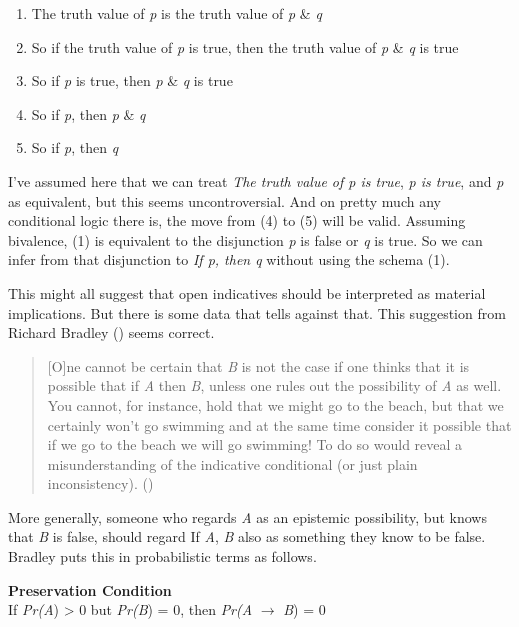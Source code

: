 \documentclass[
  11pt,
  letterpaper,
  DIV=11,
  numbers=noendperiod,
  oneside]{scrartcl}
\providecommand{\tightlist}{%
  \setlength{\itemsep}{0pt}\setlength{\parskip}{0pt}}\usepackage{longtable,booktabs,array}
\begin{document}
\begin{enumerate}
\def\labelenumi{\arabic{enumi}.}
\tightlist
\item
  The truth value of \emph{p} is the truth value of \emph{p} \& \emph{q}
\item
  So if the truth value of \emph{p} is true, then the truth value of
  \emph{p} \& \emph{q} is true
\item
  So if \emph{p} is true, then \emph{p} \& \emph{q} is true
\item
  So if \emph{p}, then \emph{p} \& \emph{q}
\item
  So if \emph{p}, then \emph{q}
\end{enumerate}

I've assumed here that we can treat \emph{The truth value of p is true},
\emph{p is true}, and \emph{p} as equivalent, but this seems
uncontroversial. And on pretty much any conditional logic there is, the
move from (4) to (5) will be valid. Assuming bivalence, (1) is
equivalent to the disjunction \emph{p} is false or \emph{q} is true. So
we can infer from that disjunction to \emph{If p, then q} without using
the schema (1).

This might all suggest that open indicatives should be interpreted as
material implications. But there is some data that tells against that.
This suggestion from Richard Bradley ()
seems correct.

\begin{quote}
{[}O{]}ne cannot be certain that \emph{B} is not the case if one thinks
that it is possible that if \emph{A} then \emph{B}, unless one rules out
the possibility of \emph{A} as well. You cannot, for instance, hold that
we might go to the beach, but that we certainly won't go swimming and at
the same time consider it possible that if we go to the beach we will go
swimming! To do so would reveal a misunderstanding of the indicative
conditional (or just plain inconsistency).
()
\end{quote}

More generally, someone who regards \emph{A} as an epistemic
possibility, but knows that \emph{B} is false, should regard If
\emph{A}, \emph{B} also as something they know to be false. Bradley puts
this in probabilistic terms as follows.

\textbf{Preservation Condition}\\
If \emph{Pr(A}) \textgreater{} 0 but \emph{Pr(B}) = 0, then \emph{Pr(A}
\(\rightarrow\) \emph{B}) = 0
\end{document}
